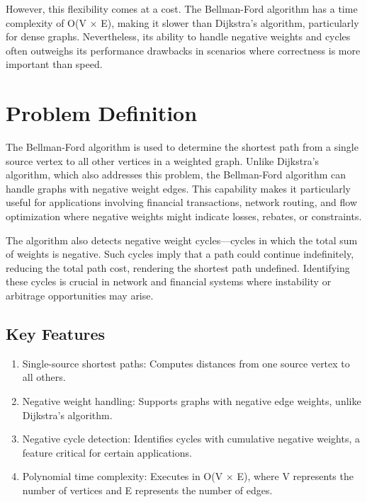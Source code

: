 \documentclass[12pt]{article}
\begin{document}
However, this flexibility comes at a cost. The Bellman-Ford algorithm has a time complexity of O(V × E), making it slower than Dijkstra's algorithm, particularly for dense graphs. Nevertheless, its ability to handle negative weights and cycles often outweighs its performance drawbacks in scenarios where correctness is more important than speed. \par


\section{Problem Definition}

The Bellman-Ford algorithm is used to determine the shortest path from a single source vertex to all other vertices in a weighted graph. Unlike Dijkstra's algorithm, which also addresses this problem, the Bellman-Ford algorithm can handle graphs with negative weight edges. This capability makes it particularly useful for applications involving financial transactions, network routing, and flow optimization where negative weights might indicate losses, rebates, or constraints. \par

The algorithm also detects negative weight cycles—cycles in which the total sum of weights is negative. Such cycles imply that a path could continue indefinitely, reducing the total path cost, rendering the shortest path undefined. Identifying these cycles is crucial in network and financial systems where instability or arbitrage opportunities may arise. \par


\subsection{Key Features}
\begin{enumerate}
	\item Single-source shortest paths: Computes distances from one source vertex to all others. 
	\item Negative weight handling: Supports graphs with negative edge weights, unlike Dijkstra's algorithm. 
	\item Negative cycle detection: Identifies cycles with cumulative negative weights, a feature critical for certain applications. 
	\item Polynomial time complexity: Executes in O(V × E), where V represents the number of vertices and E represents the number of edges.
\end{enumerate}
\end{document}
